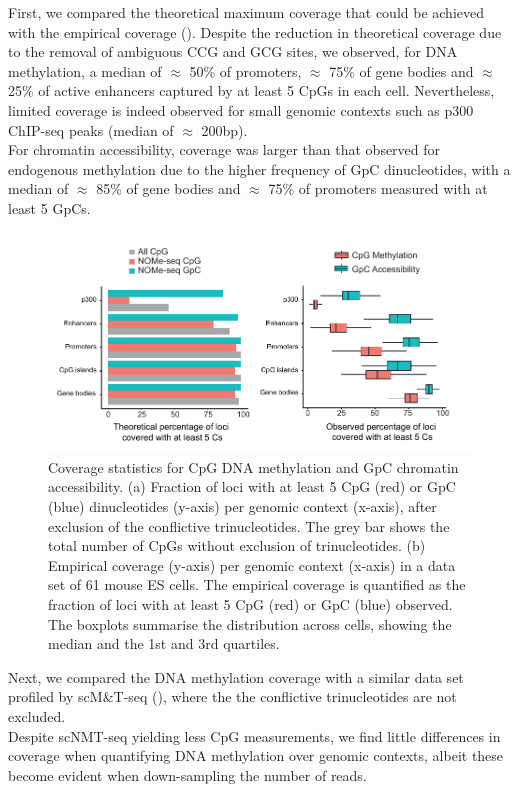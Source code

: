 First, we compared the theoretical maximum coverage that could be achieved with the empirical coverage (). Despite the reduction in theoretical coverage due to the removal of ambiguous CCG and GCG sites, we observed, for DNA methylation, a median of $\approx$ 50\% of promoters, $\approx$ 75\% of gene bodies and $\approx$ 25\% of active enhancers captured by at least 5 CpGs in each cell. Nevertheless, limited coverage is indeed observed for small genomic contexts such as p300 ChIP-seq peaks (median of $\approx$ 200bp).\\
For chromatin accessibility, coverage was larger than that observed for endogenous methylation due to the higher frequency of GpC dinucleotides, with a median of $\approx$ 85\% of gene bodies and $\approx$ 75\% of promoters measured with at least 5 GpCs.

\begin{figure}[H]
	\centering
	\includegraphics[width=1.0\linewidth]{scNMT_coverage}
	\caption[]{Coverage statistics for CpG DNA methylation and GpC chromatin accessibility. (a) Fraction of loci with at least 5 CpG (red) or GpC (blue) dinucleotides (y-axis) per genomic context (x-axis), after exclusion of the conflictive trinucleotides. The grey bar shows the total number of CpGs without exclusion of trinucleotides. (b) Empirical coverage (y-axis) per genomic context (x-axis) in a data set of 61 mouse ES cells. The empirical coverage is quantified as the fraction of loci with at least 5 CpG (red) or GpC (blue) observed. The boxplots summarise the distribution across cells, showing the median and the 1st and 3rd quartiles.}
	\label{fig:scnmt_coverage}
\end{figure}

Next, we compared the DNA methylation coverage with a similar data set profiled by scM\&T-seq \cite{Angermueller2016} (), where the the conflictive trinucleotides are not excluded.\\
Despite scNMT-seq yielding less CpG measurements, we find little differences in coverage when quantifying DNA methylation over genomic contexts, albeit these become evident when down-sampling the number of reads.

